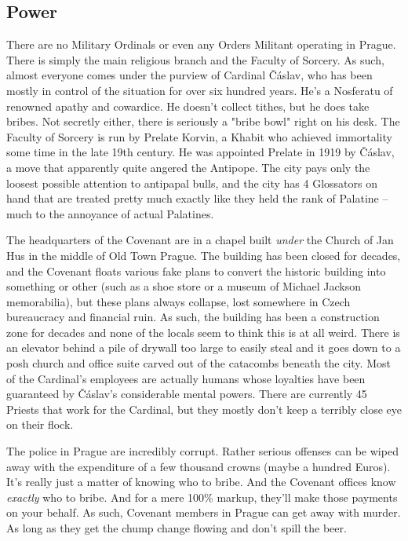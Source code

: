 \subsection{Power}

\hspace{\parindent} There are no Military Ordinals or even any Orders Militant operating in Prague. There is simply the main religious branch and the Faculty of Sorcery. As such, almost everyone comes under the purview of Cardinal \v{C}\'{a}slav, who has been mostly in control of the situation for over six hundred years. He's a Nosferatu of renowned apathy and cowardice. He doesn't collect tithes, but he does take bribes. Not secretly either, there is seriously a "bribe bowl" right on his desk. The Faculty of Sorcery is run by Prelate Korvin, a Khabit who achieved immortality some time in the late 19th century. He was appointed Prelate in 1919 by \v{C}\'{a}slav, a move that apparently quite angered the Antipope. The city pays only the loosest possible attention to antipapal bulls, and the city has 4 Glossators on hand that are treated pretty much exactly like they held the rank of Palatine -- much to the annoyance of actual Palatines.

The headquarters of the Covenant are in a chapel built \textit{under} the Church of Jan Hus in the middle of Old Town Prague. The building has been closed for decades, and the Covenant floats various fake plans to convert the historic building into something or other (such as a shoe store or a museum of Michael Jackson memorabilia), but these plans always collapse, lost somewhere in Czech bureaucracy and financial ruin. As such, the building has been a construction zone for decades and none of the locals seem to think this is at all weird. There is an elevator behind a pile of drywall too large to easily steal and it goes down to a posh church and office suite carved out of the catacombs beneath the city. Most of the Cardinal's employees are actually humans whose loyalties have been guaranteed by \v{C}\'{a}slav's considerable mental powers. There are currently 45 Priests that work for the Cardinal, but they mostly don't keep a terribly close eye on their flock.

The police in Prague are incredibly corrupt. Rather serious offenses can be wiped away with the expenditure of a few thousand crowns (maybe a hundred Euros). It's really just a matter of knowing who to bribe. And the Covenant offices know \textit{exactly} who to bribe. And for a mere 100\% markup, they'll make those payments on your behalf. As such, Covenant members in Prague can get away with murder. As long as they get the chump change flowing and don't spill the beer.

